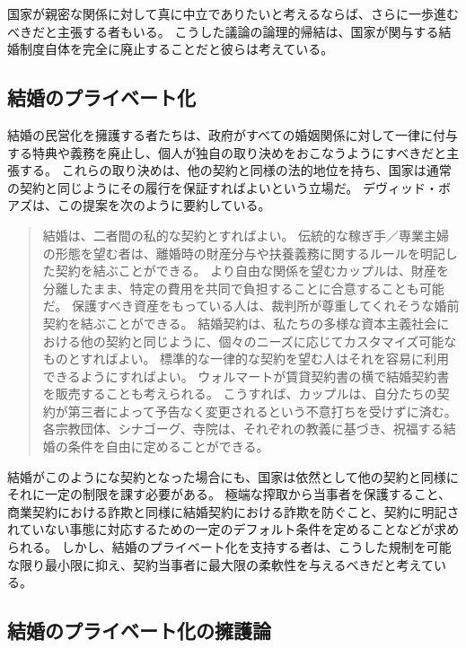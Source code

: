 \documentclass[paper=a4,book,openany]{jlreq} \usepackage{mystyle}
\begin{document}
国家が親密な関係に対して真に中立でありたいと考えるならば、さらに一歩進むべきだと主張する者もいる。
こうした議論の論理的帰結は、国家が関与する結婚制度自体を完全に廃止することだと彼らは考えている。

\subsection{結婚のプライベート化}

結婚の民営化を擁護する者たちは、政府がすべての婚姻関係に対して一律に付与する特典や義務を廃止し、個人が独自の取り決めをおこなうようにすべきだと主張する。
これらの取り決めは、他の契約と同様の法的地位を持ち、国家は通常の契約と同じようにその履行を保証すればよいという立場だ。
デヴィッド・ボアズは、この提案を次のように要約している。

\begin{quote}
結婚は、二者間の私的な契約とすればよい。
伝統的な稼ぎ手／専業主婦の形態を望む者は、離婚時の財産分与や扶養義務に関するルールを明記した契約を結ぶことができる。
より自由な関係を望むカップルは、財産を分離したまま、特定の費用を共同で負担することに合意することも可能だ。
保護すべき資産をもっている人は、裁判所が尊重してくれそうな婚前契約を結ぶことができる。
結婚契約は、私たちの多様な資本主義社会における他の契約と同じように、個々のニーズに応じてカスタマイズ可能なものとすればよい。
標準的な一律的な契約を望む人はそれを容易に利用できるようにすればよい。
ウォルマートが賃貸契約書の横で結婚契約書を販売することも考えられる。
こうすれば、カップルは、自分たちの契約が第三者によって予告なく変更されるという不意打ちを受けずに済む。
各宗教団体、シナゴーグ、寺院は、それぞれの教義に基づき、祝福する結婚の条件を自由に定めることができる。
\citep{boaz97:_privat_marriag}

\end{quote}

結婚がこのようにな契約となった場合にも、国家は依然として他の契約と同様にそれに一定の制限を課す必要がある。
極端な搾取から当事者を保護すること、商業契約における詐欺と同様に結婚契約における詐欺を防ぐこと、契約に明記されていない事態に対応するための一定のデフォルト条件を定めることなどが求められる。
しかし、結婚のプライベート化を支持する者は、こうした規制を可能な限り最小限に抑え、契約当事者に最大限の柔軟性を与えるべきだと考えている。

\subsection{結婚のプライベート化の擁護論}
\end{document}
